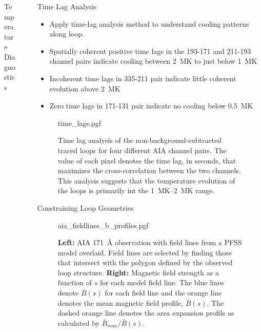 \documentclass[final]{beamer}
\newlength{\sepwidth}
\newlength{\colwidth}
\newcommand{\separatorcolumn}{\begin{column}{\sepwidth}\end{column}}
\begin{document}
\begin{frame}[t]
\begin{columns}[t]
\begin{column}{\colwidth}
\begin{block}{Temperature Diagnostics}
  \end{block}

\end{column}

\separatorcolumn

\begin{column}{\colwidth}

  \begin{block}{Time Lag Analysis}

    \begin{itemize}
      \item Apply time-lag analysis method \citep{viall_evidence_2012,barnes_understanding_2019} to understand cooling patterns along loop.
      \item Spatially coherent positive time lags in the 193-171 and 211-193 channel pairs indicate cooling between \alert{\SI{2}{\mega\K} to just below \SI{1}{\mega\K}}
      \item Incoherent time lags in 335-211 pair indicate \alert{little coherent evolution above \SI{2}{\mega\K}}
      \item Zero time lags in 171-131 pair indicate \alert{no cooling below \SI{0.5}{\mega\K}}
    \end{itemize}
    \vspace{-50pt}
    \begin{figure}
      \centering
      {time_lags.pgf}
      \caption{Time lag analysis of the non-background-subtracted traced loops for four different AIA channel pairs. The value of each pixel denotes the time lag, in seconds, that maximizes the cross-correlation between the two channels. This analysis suggests that \alert{the temperature evolution of the loops is primarily int the \SIrange{1}{2}{\mega\kelvin} range.}}
      \label{fig:timelags}
    \end{figure}
  
  \end{block}

  \begin{block}{Constraining Loop Geometries}

    \vspace{-30pt}

    \begin{figure}
      \centering
      {aia_fieldlines_b_profiles.pgf}
      \caption{\textbf{Left:} AIA \SI{171}{\angstrom} observation with field lines from a PFSS model overlaid. Field lines are selected by finding those that intersect with the polygon defined by the observed loop structure. \textbf{Right:} Magnetic field strength as a function of $s$ for each model field line. The blue lines denote $B(s)$ for each field line and the orange line denotes the mean magnetic field profile, $\bar{B}(s)$. The dashed orange line denotes the area expansion profile as calculated by $\bar{B}_{max}/\bar{B}(s)$.}
      \label{fig:aia_fieldlines_overlaid}
    \end{figure}
    

\end{block}
\end{column}
\end{columns}
\end{frame}
\end{document}
